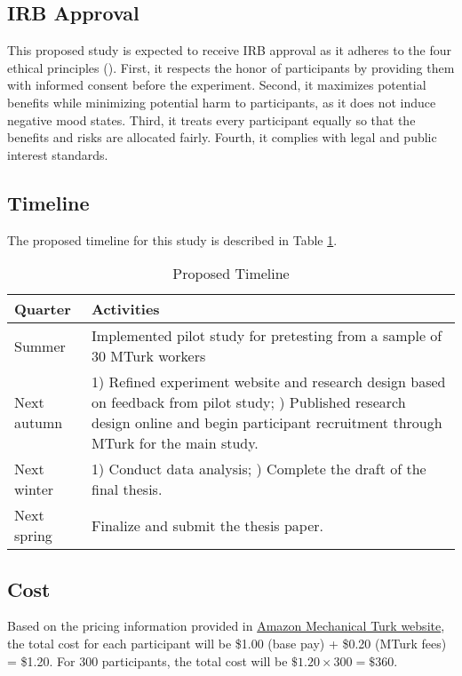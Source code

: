 \documentclass[../Proposal_Writing_Sample.tex]{subfiles}
\begin{document}
\subsection*{IRB Approval}
This proposed study is expected to receive IRB approval as it adheres to the four ethical principles (\cite{salganik_bit_2019}). First, it respects the honor of participants by providing them with informed consent before the experiment. Second, it maximizes potential benefits while minimizing potential harm to participants, as it does not induce negative mood states. Third, it treats every participant equally so that the benefits and risks are allocated fairly. Fourth, it complies with legal and public interest standards.

\subsection*{Timeline}
The proposed timeline for this study is described in Table \ref{tab: Proposed Timeline}.
\begin{table}
\centering
\begin{tabular}{|l|p{8cm}|}
\hline
\textbf{Quarter} & \textbf{Activities} \\
\hline
Summer & Implemented pilot study for pretesting from a sample of 30 MTurk workers \\
\hline
Next autumn & 1) Refined experiment website and research design based on feedback from pilot study; \newline 2) Published research design online and begin participant recruitment through MTurk for the main study. \\
\hline
Next winter & 1) Conduct data analysis; \newline 2) Complete the draft of the final thesis. \\
\hline
Next spring & Finalize and submit the thesis paper. \\
\hline
\end{tabular}
\caption{Proposed Timeline}
\label{tab: Proposed Timeline}
\end{table}

\subsection*{Cost}
Based on the pricing information provided in \href{https://requester.mturk.com/pricing}{Amazon Mechanical Turk website}, the total cost for each participant will be \$1.00 (base pay) + \$0.20 (MTurk fees) = \$1.20. For 300 participants, the total cost will be $\$1.20 \times 300 = \$360$.
\end{document}
